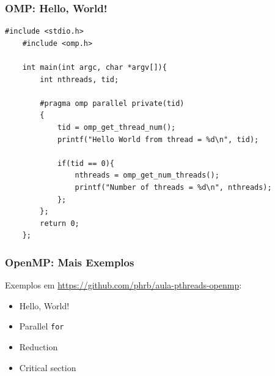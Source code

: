 \documentclass[10pt, compress]{beamer}
\begin{document}
\begin{frame}[fragile]
    \frametitle{OMP: Hello, World!}
    \begin{lstlisting}[basicstyle=\ttfamily\scriptsize]
    #include <stdio.h>
    #include <omp.h>

    int main(int argc, char *argv[]){
        int nthreads, tid;

        #pragma omp parallel private(tid)
        {
            tid = omp_get_thread_num();
            printf("Hello World from thread = %d\n", tid);

            if(tid == 0){
                nthreads = omp_get_num_threads();
                printf("Number of threads = %d\n", nthreads);
            };
        };
        return 0;
    };
    \end{lstlisting}
\end{frame}

\begin{frame}
    \frametitle{OpenMP: Mais Exemplos}
    Exemplos em \url{https://github.com/phrb/aula-pthreads-openmp}:
    \begin{itemize}
        \item Hello, World!
        \item Parallel \texttt{for}
        \item Reduction
        \item Critical section
    \end{itemize}
\end{frame}

\maketitle
\end{document}
